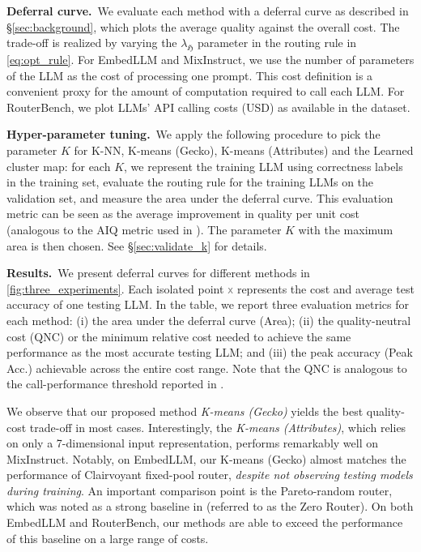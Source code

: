 \textbf{Deferral curve.}\ We evaluate each method with a deferral curve as described in \S\ref{sec:background}, which plots the average quality against the overall cost.
The trade-off is realized by varying the $\lambda_\mathfrak{H}$ parameter in the routing rule in \eqref{eq:opt_rule}.
For EmbedLLM and MixInstruct, we use the number of parameters of the LLM as the cost of processing one prompt. 
This cost definition is a convenient proxy for the amount of computation required to call each LLM.
For RouterBench, we plot LLMs' API calling costs (USD) as available in the dataset.


\textbf{Hyper-parameter tuning.}\ We apply the following procedure to pick the parameter $K$ for K-NN, K-means (Gecko), K-means (Attributes) and the Learned cluster map: for each $K$, we represent the training LLM using correctness labels in the training set, evaluate the routing rule for the training LLMs on the validation set, and measure the area under the deferral curve. This evaluation metric can be seen as the average improvement in quality per unit cost (analogous to the AIQ metric used in \citet{HuBieLi2024}). The parameter $K$ with the maximum area is then chosen. See \S\ref{sec:validate_k} for details.


\textbf{Results.}\ We present deferral curves for different methods in \cref{fig:three_experiments}. Each isolated  point \textcolor{gray}{\texttt{x}} represents the cost and average test accuracy of one testing LLM.
In the table, we report three evaluation metrics for each method: (i) the area under the deferral curve (Area); (ii) the quality-neutral cost (QNC) or the minimum relative cost needed to achieve the same performance as the most accurate testing LLM; and (iii) the peak accuracy (Peak Acc.) achievable across the entire cost range. 
Note that the QNC is analogous to the  call-performance threshold %
reported in \citet{OngAlmWu2024}. %

We observe that our proposed  method \emph{K-means (Gecko)} yields the best quality-cost trade-off in most cases. Interestingly, the \emph{K-means (Attributes)}, which relies on only a 7-dimensional input representation, performs remarkably well 
on MixInstruct.
Notably, on EmbedLLM, our K-means (Gecko) almost matches the performance of Clairvoyant fixed-pool router, \emph{despite not observing testing models during training}.
An important comparison point is 
the Pareto-random router, which was noted as a strong baseline in \citet{HuBieLi2024} (referred to as the Zero Router). On both EmbedLLM and RouterBench, our methods are able to exceed the performance of this baseline on a large range of costs. %


